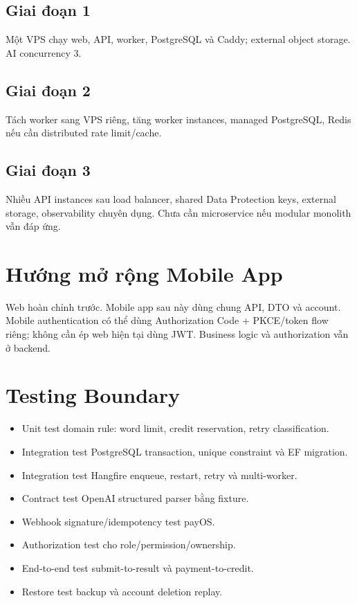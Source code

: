 \documentclass[11pt,a4paper]{article}
\begin{document}
\subsection{Giai đoạn 1}
Một VPS chạy web, API, worker, PostgreSQL và Caddy; external object storage. AI concurrency 3.

\subsection{Giai đoạn 2}
Tách worker sang VPS riêng, tăng worker instances, managed PostgreSQL, Redis nếu cần distributed rate limit/cache.

\subsection{Giai đoạn 3}
Nhiều API instances sau load balancer, shared Data Protection keys, external storage, observability chuyên dụng. Chưa cần microservice nếu modular monolith vẫn đáp ứng.

\section{Hướng mở rộng Mobile App}

Web hoàn chỉnh trước. Mobile app sau này dùng chung API, DTO và account. Mobile authentication có thể dùng Authorization Code + PKCE/token flow riêng; không cần ép web hiện tại dùng JWT. Business logic và authorization vẫn ở backend.

\section{Testing Boundary}

\begin{itemize}
  \item Unit test domain rule: word limit, credit reservation, retry classification.
  \item Integration test PostgreSQL transaction, unique constraint và EF migration.
  \item Integration test Hangfire enqueue, restart, retry và multi-worker.
  \item Contract test OpenAI structured parser bằng fixture.
  \item Webhook signature/idempotency test payOS.
  \item Authorization test cho role/permission/ownership.
  \item End-to-end test submit-to-result và payment-to-credit.
  \item Restore test backup và account deletion replay.
\end{itemize}
\end{document}
